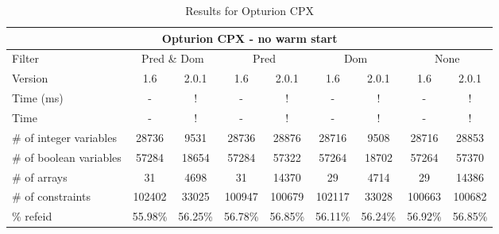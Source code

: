 \documentclass{standalone}
\begin{document}
\begin{table}[H]
\footnotesize
\centering
\begin{tabular}{lc|c|c|c|c|c|c|c}
\multicolumn{9}{c}{Opturion CPX - no warm start} \\ 
\hline\hline Filter & \multicolumn{2}{c|}{Pred \& Dom} &\multicolumn{2}{c|}{Pred}  & \multicolumn{2}{c|}{Dom} & \multicolumn{2}{c}{None} \\ 
\hline Version & 1.6 & 2.0.1 & 1.6 & 2.0.1 & 1.6 & 2.0.1 & 1.6 & 2.0.1 \\ 
Time (ms)               &    -     & !       & -       & !       & -       & !       & -       & !       \\ 
Time                    &    -     & !       & -       & !       & -       & !       & -       & !       \\ 
\# of integer variables & 28736    & 9531    & 28736   & 28876   & 28716   & 9508    & 28716   & 28853	  \\ 
\# of boolean variables & 57284    & 18654   & 57284   & 57322   & 57264   & 18702   & 57264   & 57370	  \\ 
\# of arrays            & 31       & 4698    & 31      & 14370   & 29      & 4714   & 29      & 14386	  \\ 
\# of constraints       & 102402   & 33025   & 100947  & 100679  & 102117  & 33028   & 100663  & 100682  \\ 
\% refeid               & 55.98\%  & 56.25\% & 56.78\% & 56.85\% & 56.11\% & 56.24\% & 56.92\% & 56.85\% \\ 
\end{tabular}
\caption{Results for Opturion CPX}\label{tab:res_cpx}
\end{table}
\end{document}

